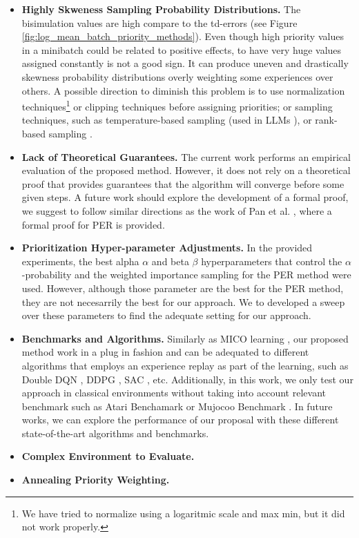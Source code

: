\begin{itemize}
    \item \textbf{Highly Skweness Sampling Probability Distributions.} The bisimulation values are high compare to the td-errors (see Figure \ref{fig:log_mean_batch_priority_methods}). Even though high priority values in a minibatch could be related to positive effects, to have very huge values assigned constantly is not a good sign. It can produce uneven and drastically skewness probability distributions overly weighting some experiences over others. A possible direction to diminish this problem is to use normalization techniques\footnote{We have tried to normalize using a logaritmic scale and max min, but it did not work properly.} or clipping techniques before assigning priorities; or sampling techniques, such as temperature-based sampling (used in LLMs \cite{jm3}), or rank-based sampling \cite{schaul2015prioritized}.
    \item \textbf{Lack of Theoretical Guarantees.} The current work performs an empirical evaluation of the proposed method. However, it does not rely on a theoretical proof that provides guarantees that the algorithm will converge before some given steps. A future work should explore the development of a formal proof, we suggest to follow similar directions as the work of Pan et al. \cite{pan2022understanding}, where a formal proof for PER is provided.
    \item \textbf{Prioritization Hyper-parameter Adjustments.} In the provided experiments, the best alpha $\alpha$ and beta $\beta$ hyperparameters that control the $\alpha$-probability and the weighted importance sampling for the PER \cite{schaul2015prioritized} method were used. However, although those parameter are the best for the PER method, they are not necesarrily the best for our approach. We to developed a sweep over these parameters to find the adequate setting for our approach.
    \item \textbf{Benchmarks and Algorithms.} Similarly as MICO learning \cite{castro2021mico}, our proposed method work in a plug in fashion and can be adequated to different algorithms that employs an experience replay as part of the learning, such as Double DQN \cite{van2016deep}, DDPG \cite{lillicrap2015continuous}, SAC \cite{haarnoja2018soft}, etc. Additionally, in this work, we only test our approach in classical environments without taking into account relevant benchmark such as Atari Benchamark \cite{bellemare2013arcade, machado2018revisiting} or Mujocoo Benchmark \cite{todorov2012mujoco}. In future works, we can explore the performance of our proposal with these different state-of-the-art algorithms and benchmarks.
    \item \textbf{Complex Environment to Evaluate.}
    \item \textbf{Annealing Priority Weighting.}
\end{itemize}



